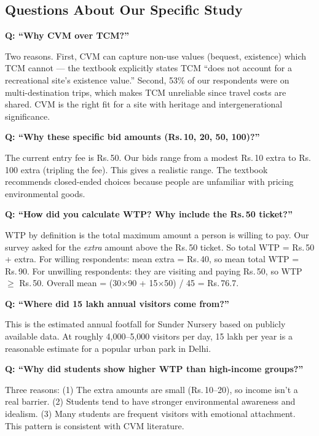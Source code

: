 \documentclass[11pt, a4paper]{article}
\newcommand{\rupee}{Rs.\,}
\newenvironment{ansbox}{%
    \def\FrameCommand{\textcolor{darkgreen}{\vrule width 2pt}\hspace{8pt}}%
    \MakeFramed{\advance\hsize-\width\FrameRestore}%
}{%
    \endMakeFramed%
}
\begin{document}
\subsection{Questions About Our Specific Study}

\textbf{Q: ``Why CVM over TCM?''}
\begin{ansbox}
Two reasons. First, CVM can capture non-use values (bequest, existence) which TCM cannot --- the textbook explicitly states TCM ``does not account for a recreational site's existence value.'' Second, 53\% of our respondents were on multi-destination trips, which makes TCM unreliable since travel costs are shared. CVM is the right fit for a site with heritage and intergenerational significance.
\end{ansbox}

\textbf{Q: ``Why these specific bid amounts (\rupee 10, 20, 50, 100)?''}
\begin{ansbox}
The current entry fee is \rupee 50. Our bids range from a modest \rupee 10 extra to \rupee 100 extra (tripling the fee). This gives a realistic range. The textbook recommends closed-ended choices because people are unfamiliar with pricing environmental goods.
\end{ansbox}

\textbf{Q: ``How did you calculate WTP? Why include the \rupee 50 ticket?''}
\begin{ansbox}
WTP by definition is the total maximum amount a person is willing to pay. Our survey asked for the \textit{extra} amount above the \rupee 50 ticket. So total WTP = \rupee 50 + extra. For willing respondents: mean extra = \rupee 40, so mean total WTP = \rupee 90. For unwilling respondents: they are visiting and paying \rupee 50, so WTP $\geq$ \rupee 50. Overall mean = (30$\times$90 + 15$\times$50) / 45 = \rupee 76.7.
\end{ansbox}

\textbf{Q: ``Where did 15 lakh annual visitors come from?''}
\begin{ansbox}
This is the estimated annual footfall for Sunder Nursery based on publicly available data. At roughly 4,000--5,000 visitors per day, 15 lakh per year is a reasonable estimate for a popular urban park in Delhi.
\end{ansbox}

\textbf{Q: ``Why did students show higher WTP than high-income groups?''}
\begin{ansbox}
Three reasons: (1) The extra amounts are small (\rupee 10--20), so income isn't a real barrier. (2) Students tend to have stronger environmental awareness and idealism. (3) Many students are frequent visitors with emotional attachment. This pattern is consistent with CVM literature.
\end{ansbox}
\end{document}
